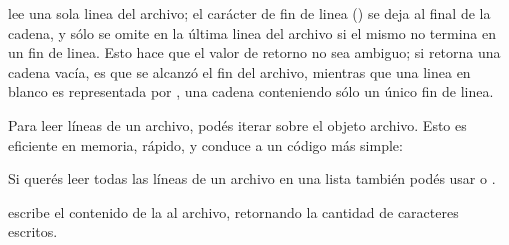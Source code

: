 \documentclass[a4,10pt,spanish]{sphinxmanual}
\begin{document}
\sphinxAtStartPar
{} lee una sola linea del archivo; el carácter de fin de linea () se deja al final de la cadena, y sólo se omite en la última linea del archivo si el mismo no termina en un fin de linea.  Esto hace que el valor de retorno no sea ambiguo; si  retorna una cadena vacía, es que se alcanzó el fin del archivo, mientras que una linea en blanco es representada por , una cadena conteniendo sólo un único fin de linea.

\begin{sphinxVerbatim}[commandchars=\\\{\}]
\end{sphinxVerbatim}

\sphinxAtStartPar
Para leer líneas de un archivo, podés iterar sobre el objeto archivo. Esto es eficiente en memoria, rápido, y conduce a un código más simple:

\begin{sphinxVerbatim}[commandchars=\\\{\}]
   
     
\end{sphinxVerbatim}

\sphinxAtStartPar
Si querés leer todas las líneas de un archivo en una lista también podés usar  o .

\sphinxAtStartPar
{} escribe el contenido de la  al archivo, retornando la cantidad de caracteres escritos.

\begin{sphinxVerbatim}[commandchars=\\\{\}]
\end{sphinxVerbatim}
\end{document}
